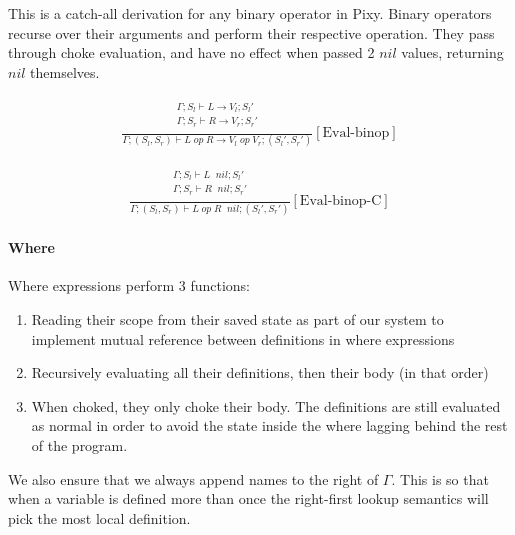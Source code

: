 \documentclass{scrartcl}
\DeclareMathOperator{\ceval}{\overset{C}{\rightarrow}}
\begin{document}
    This is a catch-all derivation for any binary operator in Pixy. Binary operators recurse over their arguments and perform their respective operation. They pass through choke evaluation, and have no effect when passed 2 $nil$ values, returning $nil$ themselves.
    
    \begin{align*}
    \frac{
        \begin{matrix}
        \Gamma; S_l \vdash L \rightarrow V_l; S_l' \\
        \Gamma; S_r \vdash R \rightarrow V_r; S_r' \\
        \end{matrix}
    }{
        \Gamma; (S_l, S_r) \vdash L \; op \; R \rightarrow V_l \; op \; V_r; (S_l', S_r')
    }[\text{Eval-binop}]
    \end{align*}
    
    \begin{align*}
    \frac{
        \begin{matrix}
        \Gamma; S_l \vdash L \ceval nil; S_l' \\
        \Gamma; S_r \vdash R \ceval nil; S_r' \\
        \end{matrix}
    }{
        \Gamma; (S_l, S_r) \vdash L \; op \; R \ceval nil; (S_l', S_r')
    }[\text{Eval-binop-C}]
    \end{align*}
    
    \paragraph{Where}
    
    Where expressions perform 3 functions:
    
    \begin{enumerate}
        \item Reading their scope from their saved state as part of our system to implement mutual reference between definitions in where expressions
        \item Recursively evaluating all their definitions, then their body (in that order)
        \item When choked, they only choke their body. The definitions are still evaluated as normal in order to avoid the state inside the where lagging behind the rest of the program.
    \end{enumerate}

    We also ensure that we always append names to the right of $\Gamma$. This is so that when a variable is defined more than once the right-first lookup semantics will pick the most local definition.
    
\end{document}
